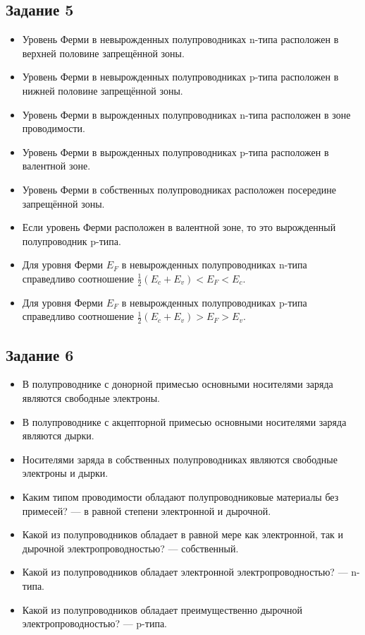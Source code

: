\documentclass[../main.tex]{subfiles}
\begin{document}
\subsection{Задание 5}
\begin{itemize}
  \item Уровень Ферми в невырожденных полупроводниках n-типа расположен в верхней половине запрещённой зоны.
  \item Уровень Ферми в невырожденных полупроводниках p-типа расположен в нижней половине запрещённой зоны.
  \item Уровень Ферми в вырожденных полупроводниках n-типа расположен в зоне проводимости.
  \item Уровень Ферми в вырожденных полупроводниках p-типа расположен в валентной зоне.
  \item Уровень Ферми в собственных полупроводниках расположен посередине запрещённой зоны.
  \item Если уровень Ферми расположен в валентной зоне, то это вырожденный полупроводник p-типа.
  \item Для уровня Ферми $E_F$ в невырожденных полупроводниках n-типа справедливо соотношение $\tfrac{1}{2}(E_c+E_v) < E_F < E_c$.
  \item Для уровня Ферми $E_F$ в невырожденных полупроводниках p-типа справедливо соотношение $\tfrac{1}{2}(E_c+E_v) > E_F > E_v$.
\end{itemize}

\subsection{Задание 6}
\begin{itemize}
  \item В полупроводнике с донорной примесью основными носителями заряда являются свободные электроны.
  \item В полупроводнике с акцепторной примесью основными носителями заряда являются дырки.
  \item Носителями заряда в собственных полупроводниках являются свободные электроны и дырки.
  \item Каким типом проводимости обладают полупроводниковые материалы без примесей? --- в равной степени электронной и дырочной.
  \item Какой из полупроводников обладает в равной мере как электронной, так и дырочной электропроводностью? --- собственный.
  \item Какой из полупроводников обладает электронной электропроводностью? --- n-типа.
  \item Какой из полупроводников обладает преимущественно дырочной электропроводностью? --- p-типа.
\end{itemize}
\end{document}
